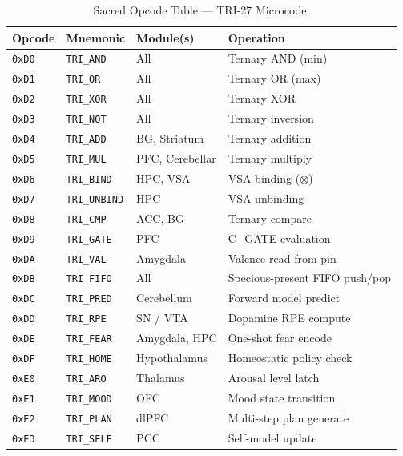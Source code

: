 \begin{table}[htbp]
\centering
\caption{Sacred Opcode Table — TRI-27 Microcode.}
\label{tab:flos73-opcodes}
\small
\begin{tabular}{lllp{5.8cm}}
\toprule
Opcode & Mnemonic & Module(s) & Operation \\
\midrule
\texttt{0xD0} & \texttt{TRI\_AND}  & All             & Ternary AND (min) \\
\texttt{0xD1} & \texttt{TRI\_OR}   & All             & Ternary OR (max) \\
\texttt{0xD2} & \texttt{TRI\_XOR}  & All             & Ternary XOR \\
\texttt{0xD3} & \texttt{TRI\_NOT}  & All             & Ternary inversion \\
\texttt{0xD4} & \texttt{TRI\_ADD}  & BG, Striatum    & Ternary addition \\
\texttt{0xD5} & \texttt{TRI\_MUL}  & PFC, Cerebellar & Ternary multiply \\
\texttt{0xD6} & \texttt{TRI\_BIND} & HPC, VSA        & VSA binding ($\otimes$) \\
\texttt{0xD7} & \texttt{TRI\_UNBIND} & HPC           & VSA unbinding \\
\texttt{0xD8} & \texttt{TRI\_CMP}  & ACC, BG         & Ternary compare \\
\texttt{0xD9} & \texttt{TRI\_GATE} & PFC             & C\_GATE evaluation \\
\texttt{0xDA} & \texttt{TRI\_VAL}  & Amygdala        & Valence read from pin \\
\texttt{0xDB} & \texttt{TRI\_FIFO} & All             & Specious-present FIFO push/pop \\
\texttt{0xDC} & \texttt{TRI\_PRED} & Cerebellum      & Forward model predict \\
\texttt{0xDD} & \texttt{TRI\_RPE}  & SN / VTA        & Dopamine RPE compute \\
\texttt{0xDE} & \texttt{TRI\_FEAR} & Amygdala, HPC   & One-shot fear encode \\
\texttt{0xDF} & \texttt{TRI\_HOME} & Hypothalamus    & Homeostatic policy check \\
\texttt{0xE0} & \texttt{TRI\_ARO}  & Thalamus        & Arousal level latch \\
\texttt{0xE1} & \texttt{TRI\_MOOD} & OFC             & Mood state transition \\
\texttt{0xE2} & \texttt{TRI\_PLAN} & dlPFC           & Multi-step plan generate \\
\texttt{0xE3} & \texttt{TRI\_SELF} & PCC             & Self-model update \\
\bottomrule
\end{tabular}
\end{table}

